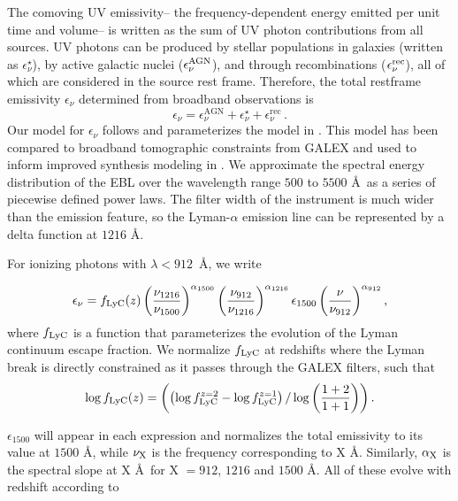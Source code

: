 \documentclass[fleqn,usenatbib]{mnras}
\begin{document}
The comoving UV emissivity-- the frequency-dependent energy emitted per unit time and volume-- is written as the sum of UV photon contributions from all sources. UV photons can be produced by stellar populations in galaxies (written as $\epsilon_{\nu}^{\star}$), by active galactic nuclei ($\epsilon_{\nu}^{\rm AGN}$), and through recombinations ($\epsilon_{\nu}^{\rm rec}$), all of which are considered in the source rest frame. Therefore, the total restframe emissivity $\epsilon_{\nu}$ determined from broadband observations is
\begin{equation}
\epsilon_{\nu} = \epsilon_{\nu}^\mathrm{AGN} + \epsilon_{\nu}^\mathrm{\star} + \epsilon_{\nu}^\mathrm{rec}\,.
\end{equation}
Our model for $\epsilon_{\nu}$ follows \cite{Chiang_2019} and parameterizes the model in \citet{2012ApJ...746..125H}. This model has been compared to broadband tomographic constraints from {\small GALEX} and used to inform improved synthesis modeling in \citet{Faucher_Gigu_re_2020}. We approximate the spectral energy distribution of the EBL over the wavelength range $500$ to $5500$ \AA~as a series of piecewise defined power laws. The filter width of the instrument is much wider than the emission feature, so the Lyman-$\alpha$ emission line can be represented by a delta function at $1216$ \AA. 

For ionizing photons with $\lambda < 912$~\AA, we write

\begin{equation}
\label{emiss_less_912}
\epsilon_{\nu} = f_{\rm LyC}(z) \left(\frac{\nu_{1216}}{\nu_{1500}}\right)^{\alpha_{1500}} \left(\frac{\nu_{912}}{\nu_{1216}}\right)^{\alpha_{1216}}\epsilon_{1500} \left( \frac{\nu}{\nu_{912}}\right)^ {\alpha_{912}},  
\end{equation}
where $f_{\rm LyC}$ is a function that parameterizes the evolution of the Lyman continuum escape fraction. We normalize $f_{\rm LyC}$ at redshifts where the Lyman break is directly constrained as it passes through the {\small GALEX} filters, such that
\begin{equation}
    \log f_{\rm LyC}(z) = \left( \left( \log{f_{\rm LyC}^{z=2}} - \log {f_{\rm LyC}^{z=1}}\right) / \log{\left(\frac{1+2}{1+1}\right) }\right). %
\end{equation}



$\epsilon_{1500}$ will appear in each expression and normalizes the total emissivity to its value at $1500$ \AA, while $\nu_{\rm X}$ is the frequency corresponding to X \AA. Similarly, $\alpha_{\rm X}$ is the spectral slope at X \AA~for X $= 912$, $1216$ and $1500$ \AA. All of these evolve with redshift according to  
\end{document}
